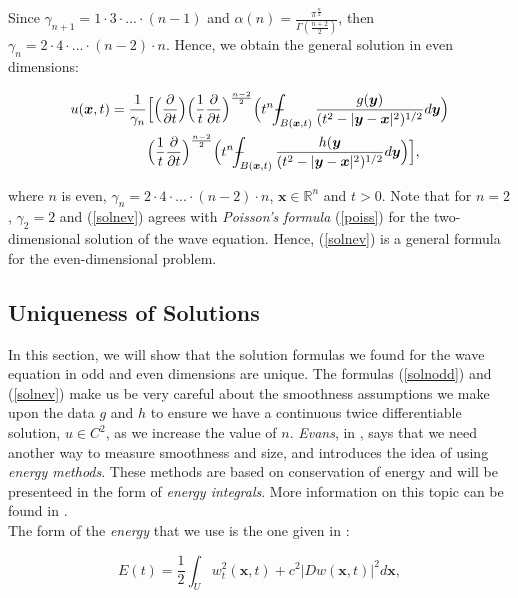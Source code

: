 \documentclass[a4paper, 12pt]{article}
\def\Xint#1{\mathchoice
{\XXint\displaystyle\textstyle{#1}}%
{\XXint\textstyle\scriptstyle{#1}}%
{\XXint\scriptstyle\scriptscriptstyle{#1}}%
{\XXint\scriptscriptstyle\scriptscriptstyle{#1}}%
\!\int}
\def\XXint#1#2#3{{\setbox0=\hbox{$#1{#2#3}{\int}$ }
\vcenter{\hbox{$#2#3$ }}\kern-.6\wd0}}
\def\dashint{\Xint-}
\numberwithin{equation}{section}
\begin{document}
Since $\gamma_{n+1}=1 \cdot 3 \cdot ... \cdot (n-1)$ and
$\alpha(n)=\frac{\pi^{\frac{n}{2}}}{\Gamma(\frac{n+2}{2})}$, then $\gamma_n=2
\cdot 4 \cdot ... \cdot(n-2) \cdot n$. Hence, we obtain the general solution in
even dimensions:

\begin{equation} \label{solnev}
    \begin{split}
        u(\boldsymbol{x}, t)= \frac{1}{\gamma_n} &\Big[ \Big(\diffp[1]{}{t}\Big) \Big(\frac{1}{t} \diffp[1]{}{t}\Big)^{\frac{n-2}{2}}\Big(t^n \dashint_{B(\boldsymbol{x}, t)} \frac{g(\boldsymbol{y})}{(t^2-|\boldsymbol{y}-\boldsymbol{x}|^2)^{1/2}} d \boldsymbol{y} \Big)\\
        &\Big(\frac{1}{t} \diffp[1]{}{t}\Big)^{\frac{n-2}{2}}\Big(t^n \dashint_{B(\boldsymbol{x},t)} \frac{h(\boldsymbol{y}}{(t^2-|\boldsymbol{y}-\boldsymbol{x}|^2)^{1/2}} d \boldsymbol{y} \Big) \Big],
    \end{split}
\end{equation}

where $n$ is even, $\gamma_n=2 \cdot 4 \cdot ... \cdot(n-2) \cdot n$,
$\boldsymbol{x}\in \mathbb{R}^n$ and $t>0$. Note that for $n=2$, $\gamma_2 = 2$
and (\ref{solnev}) agrees with \emph{Poisson's formula} (\ref{poiss}) for the
two-dimensional solution of the wave equation. Hence, (\ref{solnev}) is a
general formula for the even-dimensional problem.


\subsection{Uniqueness of Solutions}
In this section, we will show that the solution formulas we found for the wave
equation in odd and even dimensions are unique. The formulas (\ref{solnodd}) and
(\ref{solnev}) make us be very careful about the smoothness assumptions we make
upon the data $g$ and $h$ to ensure we have a continuous twice differentiable
solution, $u \in C^2$, as we increase the value of $n$. \emph{Evans}, in
\cite{Ev}, says that we need another way to measure smoothness and size, and
introduces the idea of using \emph{energy methods}. These methods are based on
conservation of energy and will be presenteed in the form of \emph{energy
integrals}. More information on this topic can be found in \cite[Chapter VI,
Section 6]{Hil}. \\

The form of the \emph{energy} that we use is the one given in \cite{Ev}:

\begin{equation} \label{energy}
    E(t)=\frac{1}{2}\int_U w_t^2(\boldsymbol{x}, t)+c^2|Dw(\boldsymbol{x}, t)|^2d\boldsymbol{x},
\end{equation}
\end{document}
